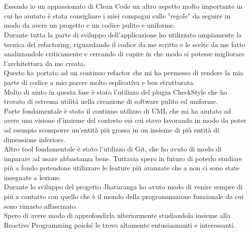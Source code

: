 \documentclass[a4paper,12pt]{report}
\begin{document}
\paragraph{}
\
\\
Essendo io un appassionato di Clean Code un altro aspetto molto importante in cui ho aiutato è stata consigliare i miei compagni sulle "regole" da seguire in modo da avere un progetto e un codice pulito e uniforme. 
\\
Durante tutta la parte di sviluppo dell'applicazione ho utilizzato ampiamente la tecnica del refactoring, riguardando il codice da me scritto e le scelte da me fatte analizzandole criticamente e cercando di capire in che modo si potesse migliorare l'architettura da me creata. 
\\
Questo ha portato ad un continuo refactor che mi ha permesso di rendere la mia parte di codice a mio parere molto esplicativa e ben strutturata.
\\
Molto di aiuto in questa fase è stato l'utilizzo del plugin CheckStyle che ho trovato di estrema utilità nella creazione di software pulito ed uniforme.
\\
Parte fondamentale è stato il continuo utilizzo di UML che mi ha aiutato ad avere una visione d'insieme del contesto sui cui stavo lavorando in modo da poter ad esempio scomporre un'entità più grossa in un insieme di più entità di dimensione inferiore.
\\
Altro tool fondamentale è stato l'utilizzo di Git, che ho avuto di modo di imparare ad usare abbastanza bene.
Tuttavia spero in futuro di poterlo studiare più a fondo potendone utilizzare le feature più avanzate che a non ci sono state insegnate a lezione.
\\
Durante lo sviluppo del progetto Jhaturanga ho avuto modo di venire sempre di più a contatto con quello che è il mondo della programmazione funzionale da cui sono rimasto affascinato.
\\
Spero di avere modo di approfondirla ulteriormente studiandola insieme alla Reactive Programming poiché le trovo altamente entusiasmanti e interessanti.
\end{document}
